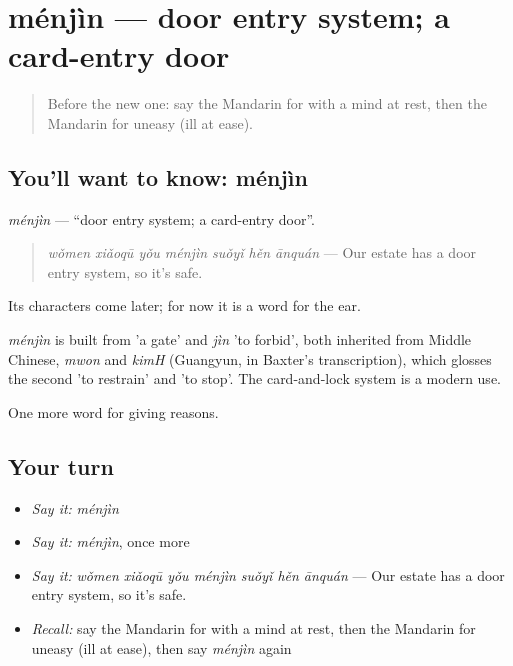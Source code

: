 \section[ménjìn]{ménjìn — door entry system; a card-entry door}

\label{lesson:ZH-C379-menjin}



\begin{quote}
Before the new one: say the Mandarin for with a mind at rest, then the Mandarin for uneasy (ill at ease).
\end{quote}

\subsection*{You'll want to know: ménjìn}
\emph{ménjìn} — \textquotedblleft{}door entry system; a card-entry door\textquotedblright{}.

\begin{quote}
\emph{wǒmen xiǎoqū yǒu ménjìn suǒyǐ hěn ānquán} — Our estate has a door entry system, so it's safe.
\end{quote}

Its characters come later; for now it is a word for the ear.

\begin{cousinweb}
\emph{ménjìn} is built from  'a gate' and \emph{jìn} 'to forbid', both inherited from Middle Chinese, \emph{mwon} and \emph{kimH} (Guangyun, in Baxter's transcription), which glosses the second 'to restrain' and 'to stop'. The card-and-lock system is a modern use.
\end{cousinweb}

\begin{grammarlens}[title={What you've built}]
One more word for giving reasons.
\end{grammarlens}

\subsection*{Your turn}
\begin{itemize}
\raggedright
  \item \emph{Say it:} \emph{ménjìn}
  \item \emph{Say it:} \emph{ménjìn}, once more
  \item \emph{Say it:} \emph{wǒmen xiǎoqū yǒu ménjìn suǒyǐ hěn ānquán} — Our estate has a door entry system, so it's safe.
  \item \emph{Recall:} say the Mandarin for with a mind at rest, then the Mandarin for uneasy (ill at ease), then say \emph{ménjìn} again
\end{itemize}

